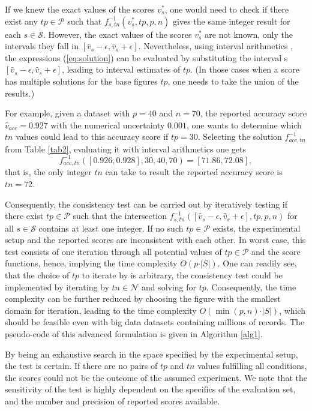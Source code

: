 \documentclass[5p, final]{elsarticle}
\begin{document}
If we knew the exact values of the scores $v_s^*$, one would need to check if there exist any $tp\in\mathcal{P}$ such that $f_{s, tn}^{-1}(v_s^*, tp, p, n)$ gives the same integer result for each $s\in\mathcal{S}$. However, the exact values of the scores $v_s^*$ are not known, only the intervals they fall in $[\hat{v}_s - \epsilon, \hat{v}_s + \epsilon]$. Nevertheless, using interval arithmetics \cite{interval}, the expressions (\ref{eq:solution}) can be evaluated by substituting the interval s$[\hat{v}_s - \epsilon, \hat{v}_s + \epsilon]$, leading to interval estimates of $tp$. (In those cases when a score has multiple solutions for the base figures $tp$, one needs to take the union of the results.) 

For example, given a dataset with $p=40$ and $n=70$, the reported accuracy score $\hat{v}_{acc} = 0.927$ with the numerical uncertainty $0.001$, one wants to determine which $tn$ values could lead to this accuracy score if $tp=30$. Selecting the solution $f^{-1}_{acc, tn}$ from Table \ref{tab2}, evaluating it with interval arithmetics one gets
\begin{equation}
f^{-1}_{acc, tn}([0.926, 0.928], 30, 40, 70) = [71.86, 72.08],
\end{equation}
that is, the only integer $tn$ can take to result the reported accuracy score is $tn=72$.

Consequently, the consistency test can be carried out by iteratively testing if there exist $tp\in\mathcal{P}$  such that the intersection $f_{s, tn}^{-1}([\hat{v}_s - \epsilon, \hat{v}_s + \epsilon], tp, p, n)$ for all $s\in\mathcal{S}$ contains at least one integer. If no such $tp\in\mathcal{P}$ exists, the experimental setup and the reported scores are inconsistent with each other. In worst case, this test consists of one iteration through all potential values of $tp\in\mathcal{P}$ and the score functions, hence, implying the time complexity $O(p\cdot \vert S\vert)$. One can readily see, that the choice of $tp$ to iterate by is arbitrary, the consistency test could be implemented by iterating by $tn\in\mathcal{N}$ and solving for $tp$. Consequently, the time complexity can be further reduced by choosing the figure with the smallest domain for iteration, leading to the time complexity $O(\min(p, n)\cdot \vert S\vert)$, which should be feasible even with big data datasets containing millions of records. The pseudo-code of this advanced formulation is given in Algorithm \ref{alg1}. 


By being an exhaustive search in the space specified by the experimental setup, the test is certain. If there are no pairs of $tp$ and $tn$ values fulfilling all conditions, the scores could not be the outcome of the assumed experiment. We note that the sensitivity of the test is highly dependent on the specifics of the evaluation set, and the number and precision of reported scores available. 
\end{document}
